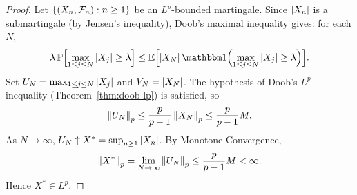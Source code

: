 \begin{proof}
    Let $\{(X_n, \mathcal{F}_n) : n \geq 1\}$ be an $L^p$-bounded martingale. Since $\left|X_n\right|$ is a submartingale (by Jensen's inequality), Doob's maximal inequality gives: for each $N$,
    \[
        \lambda \, \Prob\Bigl[\max_{1 \leq j \leq N} \abs{X_j} \geq \lambda\Bigr] \leq \E\Bigl[\abs{X_N} \ind\Bigl(\max_{1 \leq j \leq N} \abs{X_j} \geq \lambda\Bigr)\Bigr].
    \]
    Set $U_N = \max_{1 \leq j \leq N} \left|X_j\right|$ and $V_N = \left|X_N\right|$. The hypothesis of Doob's $L^p$-inequality (Theorem~\ref{thm:doob-lp}) is satisfied, so
    \[
        \left\|U_N\right\|_p \leq \frac{p}{p-1} \left\|X_N\right\|_p \leq \frac{p}{p-1} M.
    \]
    As $N \to \infty$, $U_N \uparrow X^* = \sup_{n \geq 1} \left|X_n\right|$. By Monotone Convergence,
    \[
        \left\|X^*\right\|_p = \lim_{N \to \infty} \left\|U_N\right\|_p \leq \frac{p}{p-1} M < \infty.
    \]
    Hence $X^* \in L^p$.
\end{proof}
